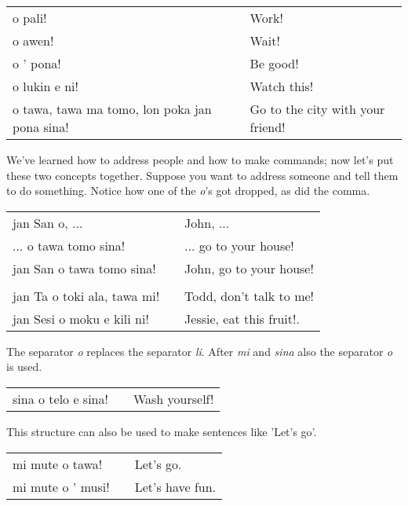 \begin{supertabular}{p{5,5cm}|ll}
o pali! && Work! \\
o awen! && Wait! \\
o ' pona! && Be good! \\
o lukin e ni! && Watch this! \\
o tawa, tawa ma tomo, lon poka jan pona sina! && Go to the city with your friend! \\
\end{supertabular} 

We've learned how to address people and how to make commands; now let's put these two concepts together. 
Suppose you want to address someone and tell them to do something. 
Notice how one of the \textit{o}'s got dropped, as did the comma. 

\begin{supertabular}{p{5,5cm}|ll}
jan San o, ...  && John, ... \\ %
 ... o tawa tomo sina! && ... go to your house! \\ %
jan San o tawa tomo sina!  && John, go to your house! \\
 && \\ %
jan Ta o toki ala, tawa mi! && Todd, don't talk to me! \\
jan Sesi o moku e kili ni! && Jessie, eat this fruit!. \\
\end{supertabular} 

The separator \textit{o} replaces the separator \textit{li}. After \textit{mi} and \textit{sina} also the separator \textit{o} is used. 

\begin{supertabular}{p{5,5cm}|ll}
sina o telo e sina! && Wash yourself! \\
\end{supertabular} 

This structure can also be used to make sentences like 'Let's go'.

\begin{supertabular}{p{5,5cm}|ll}
mi mute o tawa! && Let's go. \\
mi mute o ' musi! && Let's have fun. \\
\end{supertabular} 
%

